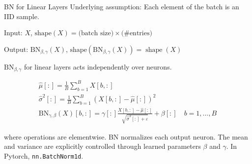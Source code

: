 \begin{frame}[allowframebreaks]

\begin{mydefinitionblock}{6.46}{BN for Linear Layers}
    Underlying assumption: Each element of the batch is an IID sample.

    Input: $X$, $\text{shape}(X) = \text{(batch size)} \times \text{(\# entries)}$

    Output: $\mathrm{BN}_{\beta, \gamma}(X)$, $\text{shape} \left(\mathrm{BN}_{\beta, \gamma}(X)\right)=\operatorname{shape}(X)$

    $\mathrm{BN}_{\beta, \gamma}$ for linear layers acts independently over neurons.

    $$
    \begin{gathered}
    \hat{\mu}[:]=\frac{1}{B} \sum_{b=1}^{B} X[b,:]\\
    \hat{\sigma}^{2}[:]=\frac{1}{B} \sum_{b=1}^{B}(X[b,:]-\hat{\mu}[:])^{2} \\
    \mathrm{BN}_{\gamma, \beta}(X)[b,:]=\gamma[:] \frac{X[b,:]-\hat{\mu}[:]}{\sqrt{\hat{\sigma}^{2}[:]+\varepsilon}}+\beta[:] \quad b=1, \ldots, B
    \end{gathered}
    $$

    where operations are elementwise. BN normalizes each output neuron. The mean and variance are explicitly controlled through learned parameters $\beta$ and $\gamma$. In Pytorch, \verb|nn.BatchNorm1d|.
\end{mydefinitionblock}

\end{frame}

